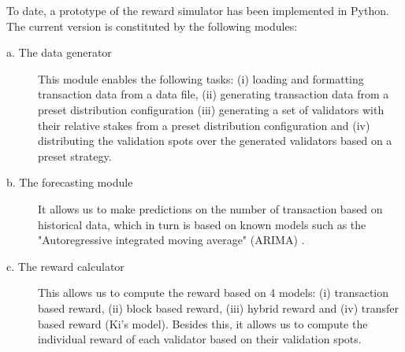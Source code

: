 To date, a prototype of the reward simulator has been implemented in Python. The current version is constituted by the following modules:

\begin{description}
    \item[a. The data generator] This module enables the following tasks: (i) loading and formatting transaction data from a data file, (ii) generating transaction data from a preset distribution configuration (iii)  generating a set of validators with their relative stakes from a preset distribution configuration and (iv) distributing the validation spots over the generated validators based on a preset strategy.

    \item[b. The forecasting module] It allows us to make predictions on the number of transaction based on historical data, which in turn is based on known models such as the "Autoregressive integrated moving average" (ARIMA) \cite{saboia1977autoregressive}.
    
    \item[c. The reward calculator] This  allows us to compute the reward based on 4 models: (i) transaction based reward, (ii) block based reward, (iii) hybrid reward and (iv) transfer based reward (Ki's model). Besides this, it allows us to compute the individual reward of each validator based on their validation spots.
\end{description}					

